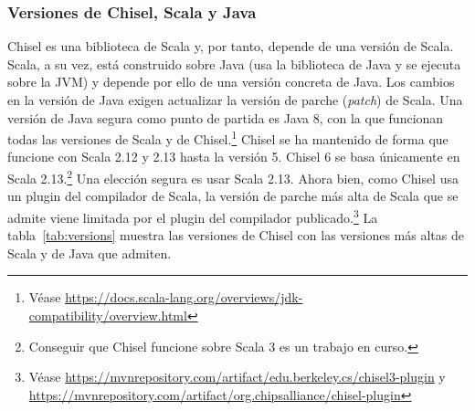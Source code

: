 \documentclass[%
    10pt,
    headinclude, footinclude=false,
    openright, %
    notitlepage,
    cleardoublepage=empty,
    headsepline,
    numbers=noenddot,
    bibliography=totoc, index=totoc,
    ]{scrbook}
\begin{document}
\subsubsection{Versiones de Chisel, Scala y Java}



Chisel es una biblioteca de Scala y, por tanto, depende de una versión de Scala.
Scala, a su vez, está construido sobre Java (usa la biblioteca de Java y se ejecuta sobre la JVM)
y depende por ello de una versión concreta de Java. Los cambios en la versión de Java exigen
actualizar la versión de parche (\emph{patch}) de Scala. Una versión de Java segura como punto de partida es Java 8,
con la que funcionan todas las versiones de Scala y de
Chisel.\footnote{Véase \url{https://docs.scala-lang.org/overviews/jdk-compatibility/overview.html}}
Chisel se ha mantenido de forma que funcione con Scala 2.12 y 2.13 hasta la versión 5.
Chisel 6 se basa únicamente en Scala 2.13.\footnote{Conseguir que Chisel funcione sobre Scala 3 es un
trabajo en curso.}
Una elección segura es usar Scala 2.13. Ahora bien, como Chisel usa un plugin del compilador de Scala,
la versión de parche más alta de Scala que se admite viene limitada por el plugin del compilador
publicado.\footnote{Véase \url{https://mvnrepository.com/artifact/edu.berkeley.cs/chisel3-plugin}
y \url{https://mvnrepository.com/artifact/org.chipsalliance/chisel-plugin}}
La tabla~\ref{tab:versions} muestra las versiones de Chisel con las versiones más altas de
Scala y de Java que admiten.
\end{document}
